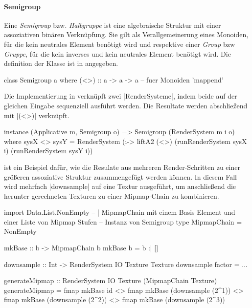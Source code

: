 
\paragraph{Semigroup}

Eine \textit{Semigroup} bzw. \textit{Halbgruppe} ist eine algebraische Struktur mit einer assoziativen binären Verknüpfung. Sie gilt als Verallgemeinerung eines Monoiden, für die kein neutrales Element benötigt wird und respektive einer \textit{Group} bzw \textit{Gruppe}, für die kein inverses und kein neutrales Element benötigt wird. Die definition der Klasse ist in  angegeben.

\begin{haskell}[label={lst:class-semigroup},caption={Semigroup Klasse\protect\footnotemark},nolol]
class Semigroup a where
  (<>) :: a -> a -> a -- fuer Monoiden 'mappend'
\end{haskell}

Die Implementierung in  verknüpft zwei |RenderSysteme|, indem beide auf der gleichen Eingabe sequenziell ausführt werden. Die Resultate werden abschließend mit |(<>)| verknüpft.

\begin{haskell}[label={lst:rendersystem-semigroup},caption={Semigroup Instanz für RenderSystem}]
instance (Applicative m, Semigroup o) => Semigroup (RenderSystem m i o) where
	sysX <> sysY =  RenderSystem (\i -> 
		liftA2 (<>) (runRenderSystem sysX i) (runRenderSystem sysY i))
\end{haskell}

 ist ein Beispiel dafür, wie die Resulate aus mehreren Render-Schritten zu einer größeren assoziative Struktur zusammengefügt werden können. In diesem Fall wird mehrfach |downsample| auf eine Textur ausgeführt, um anschließend die herunter gerechneten Texturen zu einer Mipmap-Chain zu kombinieren. 

\begin{haskell}[label={lst:rendersystem-semigroup-beispiel},caption={Beispielanwendung Semigroup für RenderSystem}]
import Data.List.NonEmpty
-- | MipmapChain mit einem Basis Element und einer Liste von Mipmap Stufen
-- Instanz von Semigroup
type MipmapChain = NonEmpty

mkBase :: b -> MipmapChain b
mkBase b = b :| []

downsample :: Int -> RenderSystem IO Texture Texture
downsample factor = ...

generateMipmap :: RenderSystem IO Texture (MipmapChain Texture)
generateMipmap = fmap mkBase id 
	<> fmap mkBase (downsample (2^1)) 
	<> fmap mkBase (downsample (2^2)) 
	<> fmap mkBase (downsample (2^3))
\end{haskell}


